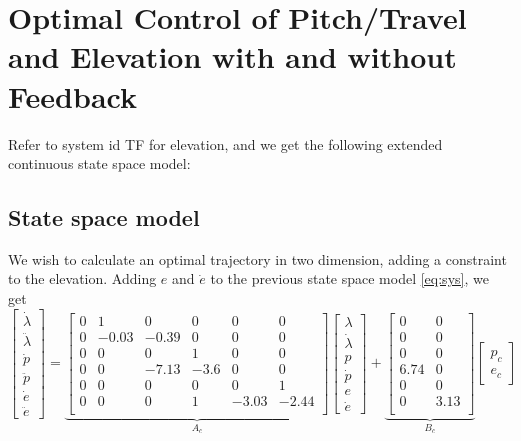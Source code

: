 \section{Optimal Control of Pitch/Travel and Elevation with and without Feedback}\label{sec:prob4}
\label{text:problem4}

Refer to system id TF for elevation, and we get the following extended continuous state space model:

\subsection{State space model}
We wish to calculate an optimal trajectory in two dimension, adding a constraint to the elevation. Adding $e$ and $\dot{e}$ to the previous state space model \eqref{eq:sys}, we get
\begin{equation}
	\begin{bmatrix}
		\dot{\lambda}\\
		\ddot{\lambda}	\\
		\dot{p}	\\
		\ddot{p}\\
		\dot{e}	\\
		\ddot{e}
	\end{bmatrix} = 
	\underbrace{
	\begin{bmatrix}
		0 & 1 & 0 & 0 & 0  & 0 \\
		0 & -0.03 & -0.39 & 0 & 0 & 0 \\
		0 & 0 & 0 & 1 & 0 & 0 \\
		0 & 0 & -7.13 & -3.6 & 0 & 0 \\
		0 & 0 & 0 & 0 & 0 & 1 \\
		0 & 0 & 0 & 1 & -3.03 & -2.44 \\
	\end{bmatrix}}_{A_c}
	\begin{bmatrix}
		\lambda	\\
		\dot{\lambda}\\
		p		\\
		\dot{p} \\
		e		\\
		\dot{e}
	\end{bmatrix} +
	\underbrace{
	\begin{bmatrix}
		0 & 0\\
		0 & 0\\
		0 & 0\\
		6.74 & 0\\
		0 & 0 \\
		0 & 3.13 \\
	\end{bmatrix}}_{B_c}
	\begin{bmatrix}
	p_c \\
	e_c
	\end{bmatrix}
	\label{eq:ex_sys}
\end{equation}

